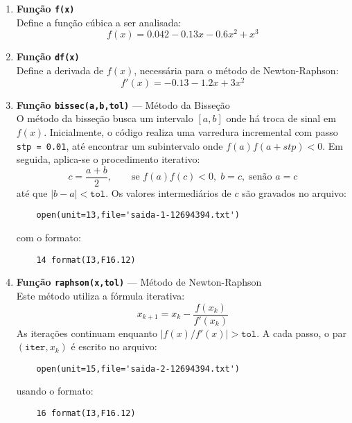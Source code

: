 \begin{enumerate}
	\item \textbf{Função \texttt{f(x)}} \\
	Define a função cúbica a ser analisada:
	\begin{equation}
		f(x) = 0.042 - 0.13x - 0.6x^2 + x^3
	\end{equation}

	\item \textbf{Função \texttt{df(x)}} \\
	Define a derivada de $f(x)$, necessária para o método de Newton-Raphson:
	\begin{equation}
		f'(x) = -0.13 - 1.2x + 3x^2
	\end{equation}

	\item \textbf{Função \texttt{bissec(a,b,tol)}} — Método da Bisseção \\
	O método da bisseção busca um intervalo $[a,b]$ onde há troca de sinal em $f(x)$.  
	Inicialmente, o código realiza uma varredura incremental com passo \texttt{stp = 0.01}, até encontrar um subintervalo onde $f(a)f(a+stp) < 0$.  
	Em seguida, aplica-se o procedimento iterativo:
	\begin{equation}
		c = \frac{a + b}{2}, \qquad
		\text{se } f(a)f(c) < 0, \; b = c, \; \text{senão } a = c
	\end{equation}
	até que $|b - a| < \texttt{tol}$.  
	Os valores intermediários de $c$ são gravados no arquivo:
	\vspace*{1\baselineskip}
	\begin{lstlisting}
	open(unit=13,file='saida-1-12694394.txt')
	\end{lstlisting}
	com o formato:
	\vspace*{1\baselineskip}
	\begin{lstlisting}
	14 format(I3,F16.12)
	\end{lstlisting}

	\item \textbf{Função \texttt{raphson(x,tol)}} — Método de Newton-Raphson \\
	Este método utiliza a fórmula iterativa:
	\begin{equation}
		x_{k+1} = x_k - \frac{f(x_k)}{f'(x_k)}
	\end{equation}
	As iterações continuam enquanto $|f(x)/f'(x)| > \texttt{tol}$.  
	A cada passo, o par $(\texttt{iter},x_k)$ é escrito no arquivo:
	\vspace*{1\baselineskip}
	\begin{lstlisting}
	open(unit=15,file='saida-2-12694394.txt')
	\end{lstlisting}
	usando o formato:
	\vspace*{1\baselineskip}
	\begin{lstlisting}
	16 format(I3,F16.12)
	\end{lstlisting}


\end{enumerate}
